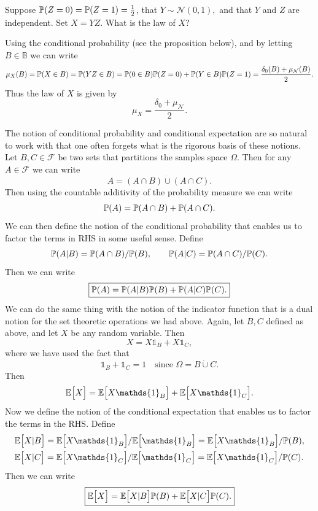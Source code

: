 \begin{problem}
	Suppose $ \mathbb{P}(Z=0)=\mathbb{P}(Z=1)=\frac{1}{2} $, that $ Y\sim \mathcal{N}(0,1),$ and that $ Y $ and $ Z $ are independent. Set $ X=YZ $. What is the law of $ X $?
\end{problem}
\begin{solution}
	Using the conditional probability (see the proposition below), and by letting $ B\in \mathbb{B} $ we can write
	\[ \mu_X(B) = \mathbb{P}(X\in B) = \mathbb{P}(YZ\in B) = \mathbb{P}(0\in B)\mathbb{P}(Z=0) + \mathbb{P}(Y\in B)\mathbb{P}(Z=1) = \frac{\delta_0(B) + \mu_\mathcal{N}(B)}{2}. \]
	Thus the law of $ X $ is given by
	\[ \mu_X = \frac{\delta_0 + \mu_\mathcal{N}}{2}.\]
\end{solution}
\begin{observation}
	The notion of conditional probability and conditional expectation are so natural to work with that one often forgets what is the rigorous basis of these notions. Let $ B,C \in \mathcal{F} $ be two sets that partitions the samples space $ \Omega $. Then for any $ A\in\mathcal{F} $ we can write
	\[ A =( A\cap B) \dot\cup (A \cap C).\]
	Then using the countable additivity of the probability measure we can write
	\[ \mathbb{P}(A) = \mathbb{P}(A\cap B) + \mathbb{P}(A\cap C). \]
	We can then define the notion of the conditional probability that enables us to factor the terms in RHS in some useful sense. Define
	\[ \mathbb{P}(A|B) = \mathbb{P}(A\cap B)/\mathbb{P}(B),\qquad \mathbb{P}(A|C) = \mathbb{P}(A\cap C)/\mathbb{P}(C). \]
	Then we can write
	\[ \boxed{\mathbb{P}(A) = \mathbb{P}(A|B)\mathbb{P}(B) + \mathbb{P}(A|C)\mathbb{P}(C).} \]
	We can do the same thing with the notion of the indicator function that is a dual notion for the set theoretic operations we had above. Again, let $ B,C $ defined as above, and let $ X $ be any random variable. Then
	\[ X = X \mathds{1}_B  + X \mathds{1}_C, \]
	where we have used the fact that 
	\[ \mathds{1}_B + \mathds{1}_C = 1 \quad \text{since } \Omega = B \dot\cup C. \]
	Then 
	\[ \E{X} = \E{X\mathds{1}_B} + \E{X\mathds{1}_C}. \]
	Now we define the notion of the conditional expectation that enables us to factor the terms in the RHS. Define
	\begin{align*}
		&\E{X|B} = \E{X\mathds{1}_B}/\E{\mathds{1}_B} = \E{X\mathds{1}_B}/\prob(B),\\ 
		&\E{X|C} = \E{X\mathds{1}_C}/\E{\mathds{1}_C} = \E{X\mathds{1}_C}/\prob(C). 
	\end{align*}
	Then we can write
	\[ \boxed{\mathbb{E}\big[X\big] = \mathbb{E}\big[X|B\big]\mathbb{P}(B) + \mathbb{E}\big[X|C\big]\mathbb{P}(C).} \]
\end{observation}

